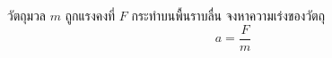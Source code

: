 \documentclass{article}
\begin{document}
วัตถุมวล $m$ ถูกแรงคงที่ $F$ กระทำบนพื้นราบลื่น จงหาความเร่งของวัตถุ
\[
a = \frac{F}{m}
\]
\end{document}
